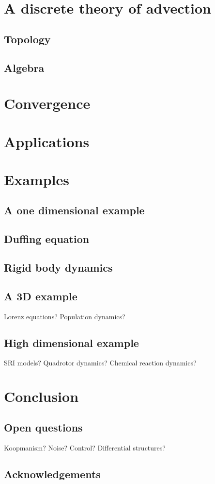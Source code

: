 \documentclass[12pt]{amsart}
\begin{document}
\section{A discrete theory of advection}

\subsection{Topology}

\subsection{Algebra}

\section{Convergence}

\section{Applications}

\section{Examples}

\subsection{A one dimensional example}

\subsection{Duffing equation}

\subsection{Rigid body dynamics}

\subsection{A 3D example}
Lorenz equations?  Population dynamics?

\subsection{High dimensional example}
SRI models?  Quadrotor dynamics?  Chemical reaction dynamics?

\section{Conclusion}

\subsection{Open questions}
Koopmanism?  Noise?  Control?  Differential structures?

\subsection{Acknowledgements}



\end{document}
